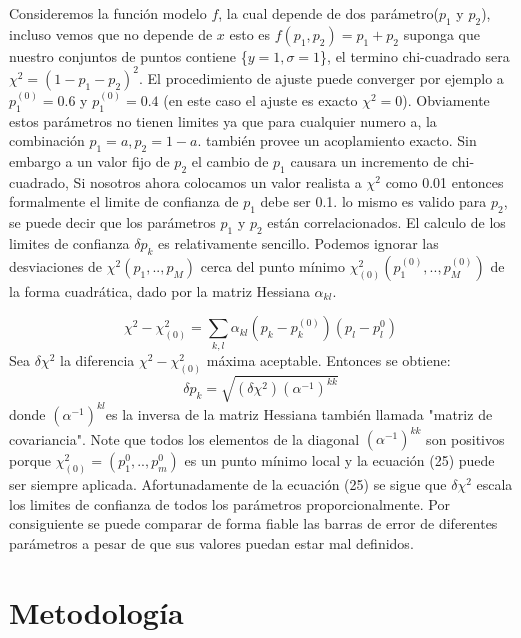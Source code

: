 \documentclass[a4paper,openright,12pt]{book}
\begin{document}
Consideremos la función modelo  $f$, la cual depende de dos parámetro($p_{1}$ y $p_{2}$), incluso vemos que no depende de $x$ esto es $f(p_{1},p_{2})=p_{1}+p_{2}$ suponga que nuestro conjuntos de puntos contiene \{$y=1,\sigma=1$\}, el termino chi-cuadrado sera $\chi^{2}=(1-p_{1}-p_{2})^{2}$. El procedimiento de ajuste puede converger por ejemplo a $p_{1}^{(0)}=0.6$ y $p_{1}^{(0)}=0.4$ (en este caso el ajuste es exacto $\chi^{2}=0$).
Obviamente estos parámetros no tienen limites ya que para cualquier numero a, la combinación $p_{1}=a,p_{2}=1-a.$ también provee un acoplamiento exacto. Sin embargo a un valor fijo de $p_{2}$ el cambio de $p_{1}$  causara un incremento de chi-cuadrado, Si nosotros ahora colocamos un valor realista a $\chi^{2}$ como 0.01 entonces formalmente el limite de confianza de $p_{1}$ debe ser 0.1. lo mismo es valido para $p_{2}$, se puede decir que los parámetros $p_{1}$ y $p_{2}$ están correlacionados.
El calculo de los limites de confianza $\delta p_{k}$ es relativamente sencillo. Podemos ignorar las desviaciones de $\chi^{2}(p_{1},..,p_{M})$ cerca del punto mínimo  $\chi_{(0)}^{2}(p_{1}^{(0)},..,p_{M}^{(0)})$ de la forma cuadrática, dado por la matriz Hessiana $\alpha_{kl}$\cite{guide}.

\begin{equation}
\chi^{2}-\chi_{(0)}^{2}=\sum_{k,l}\alpha_{kl}(p_{k}-p_{k}^{(0)})(p_{l}-p_{l}^{0})
\end{equation}
Sea $\delta\chi^{2}$ la diferencia $\chi^{2}-\chi_{(0)}^{2} $ máxima aceptable. Entonces se obtiene:
\begin{equation}
\delta p_{k}=\sqrt{(\delta \chi^{2})(\alpha^{-1})^{kk}}
\end{equation}
donde $ (\alpha^{-1})^{kl}$es la inversa de la matriz Hessiana también llamada "matriz de covariancia". Note que todos los elementos de la diagonal $ (\alpha^{-1})^{kk}$ son positivos porque $\chi_{(0)}^{2}=(p_{1}^{0},..,p_{m}^{0})$ es un punto mínimo local y la ecuación (25) puede ser siempre aplicada. Afortunadamente de la ecuación (25) se sigue que $\delta\chi^{2}$ escala los limites de confianza de todos los parámetros proporcionalmente. Por consiguiente se puede comparar de forma fiable las barras de error de diferentes parámetros a pesar de que sus valores puedan estar mal definidos\cite{guide}.
\chapter{Metodología}
\end{document}
